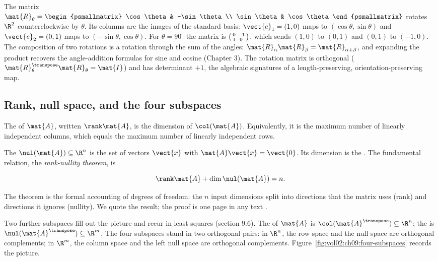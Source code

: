 \begin{example}
The matrix $\mat{R}_{\theta} = \begin{psmallmatrix} \cos\theta &
-\sin\theta \\ \sin\theta & \cos\theta \end{psmallmatrix}$ rotates
$\R^{2}$ counterclockwise by $\theta$. Its columns are the images of
the standard basis: $\vect{e}_{1} = (1,0)$ maps to $(\cos\theta,
\sin\theta)$ and $\vect{e}_{2} = (0,1)$ maps to $(-\sin\theta,
\cos\theta)$. For $\theta = 90^{\circ}$ the matrix is
$\begin{psmallmatrix} 0 & -1 \\ 1 & 0 \end{psmallmatrix}$, which
sends $(1,0)$ to $(0,1)$ and $(0,1)$ to $(-1,0)$. The composition of
two rotations is a rotation through the sum of the angles:
$\mat{R}_{\alpha}\mat{R}_{\beta} = \mat{R}_{\alpha+\beta}$, and
expanding the product recovers the angle-addition formulas for sine
and cosine (Chapter 3). The rotation matrix is orthogonal
($\mat{R}_{\theta}^{\transpose}\mat{R}_{\theta} = \mat{I}$) and has
determinant $+1$, the algebraic signatures of a length-preserving,
orientation-preserving map.
\end{example}

\subsection{Rank, null space, and the four subspaces}

The  of $\mat{A}$, written $\rank \mat{A}$, is the
dimension of $\col(\mat{A})$. Equivalently, it is the maximum number
of linearly independent columns, which equals the maximum number of
linearly independent rows.

The  $\nul(\mat{A}) \subseteq \R^{n}$ is the set
of vectors $\vect{x}$ with $\mat{A}\vect{x} = \vect{0}$. Its
dimension is the . The fundamental relation, the
\emph{rank-nullity theorem}, is

\[
\rank \mat{A} + \dim \nul(\mat{A}) = n.
\]

The theorem is the formal accounting of degrees of freedom: the $n$
input dimensions split into directions that the matrix uses (rank)
and directions it ignores (nullity). We quote the result; the proof
is one page in any text \cite[ch.~3]{text:strang2016}.

Two further subspaces fill out the picture and recur in least
squares (section 9.6). The  of $\mat{A}$ is
$\col(\mat{A}^{\transpose}) \subseteq \R^{n}$; the  is $\nul(\mat{A}^{\transpose}) \subseteq \R^{m}$. The
four subspaces stand in two orthogonal pairs: in $\R^{n}$, the row
space and the null space are orthogonal complements; in $\R^{m}$,
the column space and the left null space are orthogonal complements.
Figure~\ref{fig:vol02:ch09:four-subspaces} records the picture.

